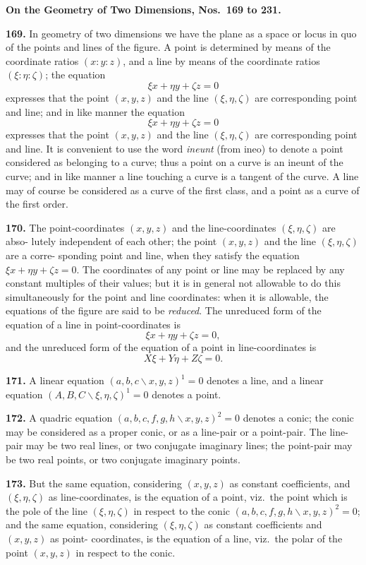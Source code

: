 \documentclass[11pt,a4paper]{article}
\begin{document}
\medskip
\textbf{On the Geometry of Two Dimensions, Nos.~169 to 231.}

\textbf{169.} In geometry of two dimensions we have the plane as a space or locus in
quo of the points and lines of the figure. A point is determined by means of the
coordinate ratios $(x:y:z)$, and a line by means of the coordinate ratios $(\xi:\eta:\zeta)$;
the equation
\[
\xi x+\eta y+\zeta z=0
\]
expresses that the point $(x,y,z)$ and the line $(\xi,\eta,\zeta)$ are corresponding point and line;
and in like manner the equation
\[
\xi x+\eta y+\zeta z=0
\]
expresses that the point $(x,y,z)$ and the line $(\xi,\eta,\zeta)$ are corresponding point and line.
It is convenient to use the word \textit{ineunt} (from ineo) to denote a point considered as
belonging to a curve; thus a point on a curve is an ineunt of the curve; and in like
manner a line touching a curve is a tangent of the curve. A line may of course be
considered as a curve of the first class, and a point as a curve of the first order.

\textbf{170.} The point-coordinates $(x,y,z)$ and the line-coordinates $(\xi,\eta,\zeta)$ are abso-
lutely independent of each other; the point $(x,y,z)$ and the line $(\xi,\eta,\zeta)$ are a corre-
sponding point and line, when they satisfy the equation $\xi x+\eta y+\zeta z=0$. The
coordinates of any point or line may be replaced by any constant multiples of their
values; but it is in general not allowable to do this simultaneously for the point and
line coordinates: when it is allowable, the equations of the figure are said to be
\textit{reduced}. The unreduced form of the equation of a line in point-coordinates is
\[
\xi x+\eta y+\zeta z=0,
\]
and the unreduced form of the equation of a point in line-coordinates is
\[
X\xi+Y\eta+Z\zeta=0.
\]

\textbf{171.} A linear equation $(a,b,c\!\backslash x,y,z)^1=0$ denotes a line, and a linear equation
$(A,B,C\!\backslash \xi,\eta,\zeta)^1=0$ denotes a point.

\textbf{172.} A quadric equation $(a,b,c,f,g,h\!\backslash x,y,z)^2=0$ denotes a conic; the conic
may be considered as a proper conic, or as a line-pair or a point-pair. The line-pair
may be two real lines, or two conjugate imaginary lines; the point-pair may be two
real points, or two conjugate imaginary points.

\textbf{173.} But the same equation, considering $(x,y,z)$ as constant coefficients, and
$(\xi,\eta,\zeta)$ as line-coordinates, is the equation of a point, viz.\ the point which is the
pole of the line $(\xi,\eta,\zeta)$ in respect to the conic $(a,b,c,f,g,h\!\backslash x,y,z)^2=0$; and the
same equation, considering $(\xi,\eta,\zeta)$ as constant coefficients and $(x,y,z)$ as point-
coordinates, is the equation of a line, viz.\ the polar of the point $(x,y,z)$ in respect to
the conic.
\end{document}
